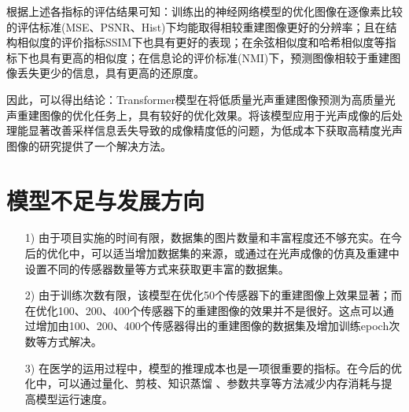 根据上述各指标的评估结果可知：训练出的神经网络模型的优化图像在逐像素比较的评估标准(MSE、PSNR、Hist)下均能取得相较重建图像更好的分辨率；且在结构相似度的评价指标SSIM下也具有更好的表现；在余弦相似度和哈希相似度等指标下也具有更高的相似度；在信息论的评价标准(NMI)下，预测图像相较于重建图像丢失更少的信息，具有更高的还原度。

因此，可以得出结论：Transformer模型在将低质量光声重建图像预测为高质量光声重建图像的优化任务上，具有较好的优化效果。将该模型应用于光声成像的后处理能显著改善采样信息丢失导致的成像精度低的问题，为低成本下获取高精度光声图像的研究提供了一个解决方法。

\section{模型不足与发展方向}
	\begin{itemize}
	\item [1)]由于项目实施的时间有限，数据集的图片数量和丰富程度还不够充实。在今后的优化中，可以适当增加数据集的来源，或通过在光声成像的仿真及重建中设置不同的传感器数量等方式来获取更丰富的数据集。
	\item [2)]由于训练次数有限，该模型在优化50个传感器下的重建图像上效果显著；而在优化100、200、400个传感器下的重建图像的效果并不是很好。这点可以通过增加由100、200、400个传感器得出的重建图像的数据集及增加训练epoch次数等方式解决。
	\item [3)]在医学的运用过程中，模型的推理成本也是一项很重要的指标。在今后的优化中，可以通过量化、剪枝\cite{rao2021dynamicvit}、知识蒸馏\cite{touvron2021training} \cite{wu2022tinyvit}、参数共享\cite{zhang2022minivit}等方法减少内存消耗与提高模型运行速度。
\end{itemize}